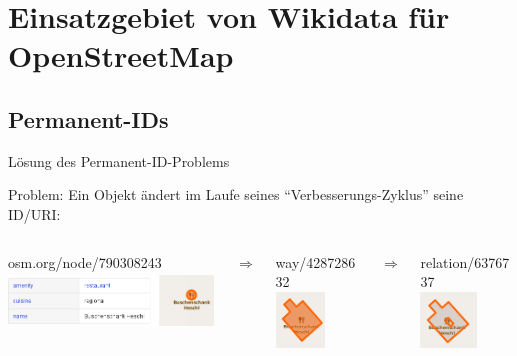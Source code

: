 \documentclass{beamer}
\begin{document}
\section{Einsatzgebiet von Wikidata für OpenStreetMap}

\subsection{Permanent-IDs}

\begin{frame}{Lösung des Permanent-ID-Problems}

 \vspace*{-0.8cm}
  Problem: Ein Objekt ändert im Laufe seines "`Verbesserungs-Zyklus"' seine ID/URI:

 \vspace*{0.2cm}

  \begin{columns}[c]

    \begin{column}[T]{60mm}
      osm.org/node/790308243 \\
      \includegraphics[height=15mm]{buschenschank-node.png}
    \end{column} 
    \pause

    \begin{column}[T]{5mm}
       \vspace*{1cm}
      $\Rightarrow$
    \end{column}

    \begin{column}[T]{20mm}
      way/428728632 \\
      \includegraphics[height=15mm]{buschenschank-way1.png}
    \end{column}
    \pause

    \begin{column}[T]{5mm}
       \vspace*{1cm}
      $\Rightarrow$
    \end{column}

    \begin{column}[T]{20mm}
      relation/6376737 \\
      \includegraphics[height=15mm]{buschenschank-rel1.png}
    \end{column}


\end{columns}
\end{frame}
\end{document}
